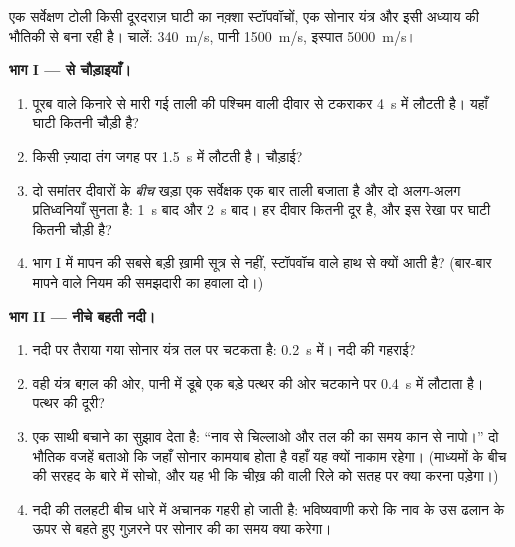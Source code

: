 \begin{problem}\label{pb:g7:sound-production:1}
एक सर्वेक्षण टोली किसी दूरदराज़ घाटी का नक़्शा स्टॉपवॉचों, एक सोनार
यंत्र और इसी अध्याय की भौतिकी से बना रही है। चालें: 
\qty{340}{m/s}, पानी \qty{1500}{m/s}, इस्पात \qty{5000}{m/s}।

\medskip\noindent\textbf{भाग I ---  से चौड़ाइयाँ।}
\begin{enumerate}
  \item पूरब वाले किनारे से मारी गई ताली की  पश्चिम वाली
        दीवार से टकराकर \qty{4}{s} में लौटती है। यहाँ घाटी कितनी
        चौड़ी है?
  \item किसी ज़्यादा तंग जगह पर  \qty{1.5}{s} में लौटती है।
        चौड़ाई?
  \item दो समांतर दीवारों के \emph{बीच} खड़ा एक सर्वेक्षक एक बार
        ताली बजाता है और दो अलग-अलग प्रतिध्वनियाँ सुनता है:
        \qty{1}{s} बाद और \qty{2}{s} बाद। हर दीवार कितनी दूर है, और
        इस रेखा पर घाटी कितनी चौड़ी है?
  \item भाग I में मापन की सबसे बड़ी ख़ामी सूत्र से नहीं, स्टॉपवॉच
        वाले हाथ से क्यों आती है? (बार-बार मापने वाले नियम की
        समझदारी का हवाला दो।)
\end{enumerate}

\medskip\noindent\textbf{भाग II --- नीचे बहती नदी।}
\begin{enumerate}[resume]
  \item नदी पर तैराया गया सोनार यंत्र तल पर चटकता है: 
        \qty{0.2}{s} में। नदी की गहराई?
  \item वही यंत्र बग़ल की ओर, पानी में डूबे एक बड़े पत्थर की ओर
        चटकाने पर  \qty{0.4}{s} में लौटाता है। पत्थर की
        दूरी?
  \item एक साथी  बचाने का सुझाव देता है: ``नाव से चिल्लाओ और तल
        की  का समय कान से नापो।'' दो भौतिक वजहें बताओ कि
        जहाँ सोनार कामयाब होता है वहाँ यह क्यों नाकाम रहेगा।
        (माध्यमों के बीच की सरहद के बारे में सोचो, और यह भी कि चीख़ की
         वाली रिले को सतह पर क्या करना पड़ेगा।)
  \item नदी की तलहटी बीच धारे में अचानक गहरी हो जाती है: भविष्यवाणी
        करो कि नाव के उस ढलान के ऊपर से बहते हुए गुज़रने पर सोनार की
         का समय क्या करेगा।
\end{enumerate}


\end{problem}
